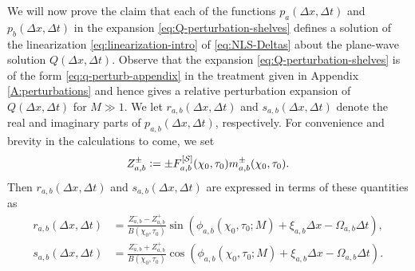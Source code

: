 We will now prove the claim that each of the functions $p_{a}(\Delta x, \Delta t)$ and $p_b(\Delta x, \Delta t)$ in the expansion \eqref{eq:Q-perturbation-shelves} defines a solution of the linearization \eqref{eq:linearization-intro} of \eqref{eq:NLS-Deltas} about the plane-wave solution $Q(\Delta x,\Delta t)$.
Observe that the expansion \eqref{eq:Q-perturbation-shelves} is of the form \eqref{eq:q-perturb-appendix} in the treatment given in Appendix \ref{A:perturbations} and hence gives a relative perturbation expansion of $Q(\Delta x,\Delta t)$ for $M\gg 1$. We let $r_{a,b}(\Delta x, \Delta t)$ and $s_{a,b}(\Delta x, \Delta t)$ denote the real and imaginary parts of $p_{a,b}(\Delta x, \Delta t)$, respectively. For convenience and brevity in the calculations to come, we set
\begin{equation}
Z_{a,b}^\pm \vcentcolon= \pm F_{a,b}^{[\mathcal{S}]}(\chi_0,\tau_0)m_{a,b}^\pm(\chi_0,\tau_0).
\label{eq:Z-a-b}
\end{equation}
Then $r_{a,b}(\Delta x, \Delta t)$ and $s_{a,b}(\Delta x, \Delta t)$ are expressed in terms of these quantities as
\begin{align}
r_{a,b}(\Delta x,\Delta t) &= \frac{Z_{a,b}^- - Z_{a,b}^+}{B(\chi_0,\tau_0)}\sin\left(\phi_{a,b}(\chi_0,\tau_0;M)+\xi_{a,b}\Delta x -\Omega_{a,b}\Delta t\right),\\
s_{a,b}(\Delta x,\Delta t) &= \frac{Z_{a,b}^- + Z_{a,b}^+}{B(\chi_0,\tau_0)}\cos\left(\phi_{a,b}(\chi_0,\tau_0;M)+\xi_{a,b}\Delta x -\Omega_{a,b}\Delta t\right).
\end{align}
